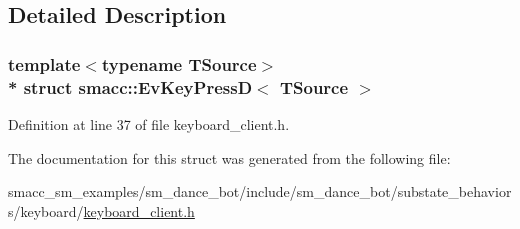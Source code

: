 \subsection{Detailed Description}
\subsubsection*{template$<$typename T\+Source$>$\\*
struct smacc\+::\+Ev\+Key\+Press\+D$<$ T\+Source $>$}



Definition at line 37 of file keyboard\+\_\+client.\+h.



The documentation for this struct was generated from the following file\+:\begin{DoxyCompactItemize}
\item 
smacc\+\_\+sm\+\_\+examples/sm\+\_\+dance\+\_\+bot/include/sm\+\_\+dance\+\_\+bot/substate\+\_\+behaviors/keyboard/\hyperlink{keyboard__client_8h}{keyboard\+\_\+client.\+h}\end{DoxyCompactItemize}
